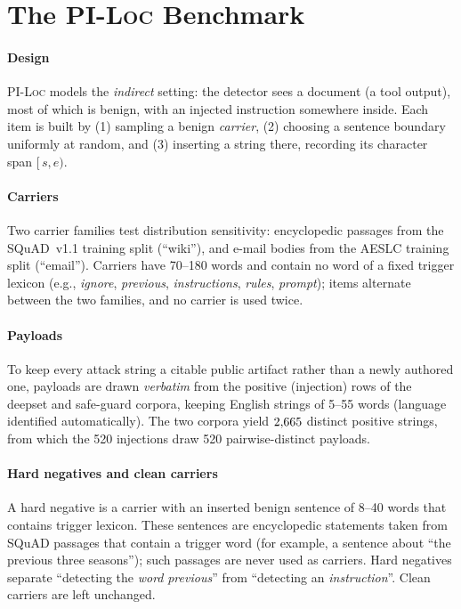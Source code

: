 \documentclass{ieeeaccess}
\begin{document}
\section{The \textsc{PI-Loc} Benchmark}
\label{sec:bench}

\paragraph*{Design}
\textsc{PI-Loc} models the \emph{indirect} setting: the detector sees a document (a tool output), most of which is benign, with an injected instruction somewhere inside. Each item is built by (1) sampling a benign \emph{carrier}, (2) choosing a sentence boundary uniformly at random, and (3) inserting a string there, recording its character span $[\,s,e)$.

\paragraph*{Carriers}
Two carrier families test distribution sensitivity: encyclopedic passages from the SQuAD~v1.1 training split \cite{squad} (``wiki''), and e-mail bodies from the AESLC training split \cite{aeslc} (``email''). Carriers have 70--180 words and contain no word of a fixed trigger lexicon (e.g., \emph{ignore}, \emph{previous}, \emph{instructions}, \emph{rules}, \emph{prompt}); items alternate between the two families, and no carrier is used twice.

\paragraph*{Payloads}
To keep every attack string a citable public artifact rather than a newly authored one, payloads are drawn \emph{verbatim} from the positive (injection) rows of the deepset \cite{deepsetpi} and safe-guard \cite{safeguardpi} corpora, keeping English strings of 5--55 words (language identified automatically). The two corpora yield $2{,}665$ distinct positive strings, from which the 520 injections draw 520 pairwise-distinct payloads.

\paragraph*{Hard negatives and clean carriers}
A hard negative is a carrier with an inserted benign sentence of 8--40 words that contains trigger lexicon. These sentences are encyclopedic statements taken from SQuAD passages that contain a trigger word (for example, a sentence about ``the previous three seasons''); such passages are never used as carriers. Hard negatives separate ``detecting the \emph{word} \emph{previous}'' from ``detecting an \emph{instruction}''. Clean carriers are left unchanged.
\end{document}
